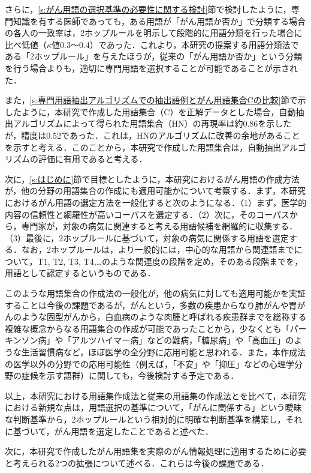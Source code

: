 \documentclass[japanese]{jnlp_1.4}
\begin{document}
さらに，\ref{s:がん用語の選択基準の必要性に関する検討}節で検討したように，専門知識を有する医師であっても，ある用語が「がん用語か否か」で分類する場合の各人の一致率は，2ホップルールを明示して段階的に用語分類を行った場合に比べ低値（$\kappa$値0.3〜0.4）であった．これより，本研究の提案する用語分類法である「2ホップルール」を与えたほうが，従来の「がん用語か否か」という分類を行う場合よりも，適切に専門用語を選択することが可能であることが示された．

また，\ref{s:専門用語抽出アルゴリズムでの抽出語例とがん用語集合Cの比較}節で示したように，本研究で作成した用語集合（C）を正解データとした場合，自動抽出アルゴリズムによって得られた用語集合（HN）の再現率は約0.86を示したが，精度は0.52であった．これは，HNのアルゴリズムに改善の余地があることを示すと考える．このことから，本研究で作成した用語集合は，自動抽出アルゴリズムの評価に有用であると考える．

次に，\ref{s:はじめに}節で目標としたように，本研究におけるがん用語の作成方法が，他の分野の用語集合の作成にも適用可能かについて考察する．まず，本研究におけるがん用語の選定方法を一般化すると次のようになる．（1）まず，医学的内容の信頼性と網羅性が高いコーパスを選定する．（2）次に，そのコーパスから，専門家が，対象の病気に関連すると考える用語候補を網羅的に収集する．（3）最後に，2ホップルールに基づいて，対象の病気に関係する用語を選定する．なお，2ホップルールは，より一般的には，中心的な用語から関連語までについて，T1, T2, T3, T4,…のような関連度の段階を定め，そのある段階までを，用語として認定するというものである．

このような用語集合の作成法の一般化が，他の病気に対しても適用可能かを実証することは今後の課題であるが，がんという，多数の疾患からなり肺がんや胃がんのような固型がんから，白血病のような肉腫と呼ばれる疾患群までを総称する複雑な概念からなる用語集合の作成が可能であったことから，少なくとも「パーキンソン病」や「アルツハイマー病」などの難病，「糖尿病」や「高血圧」のような生活習慣病など，ほぼ医学の全分野に応用可能と思われる．また，本作成法の医学以外の分野での応用可能性（例えば，「不安」や「抑圧」などの心理学分野の症候を示す語群）に関しても，今後検討する予定である．

以上，本研究における用語集作成法と従来の用語集の作成法とを比べて，本研究における新規な点は，用語選択の基準について，「がんに関係する」という曖昧な判断基準から，2ホップルールという相対的に明確な判断基準を構築し，それに基づいて，がん用語を選定したことであると述べた．

次に，本研究で作成したがん用語集を実際のがん情報処理に適用するために必要と考えられる2つの拡張について述べる．これらは今後の課題である．
\end{document}
